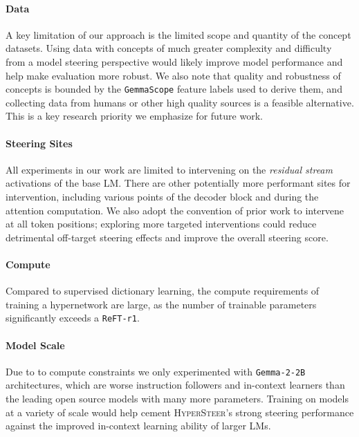 \documentclass[11pt]{article}
\newcommand{\methodname}{\textsc{HyperSteer}}
\newcommand{\gemma}{\texttt{Gemma-2-2B}}
\newcommand{\gpt}{\texttt{gpt-4o-mini}}
\begin{document}
\paragraph{Data} A key limitation of our approach is the limited scope and quantity of the concept datasets. Using data with concepts of much greater complexity and difficulty from a model steering perspective would likely improve model performance and help make evaluation more robust. We also note that quality and robustness of concepts is bounded by the \texttt{GemmaScope} feature labels used to derive them, and collecting data from humans or other high quality sources is a feasible alternative. This is a key research priority we emphasize for future work.


\paragraph{Steering Sites} All experiments in our work are limited to intervening on the \textit{residual stream} activations of the base LM. There are other potentially more performant sites for intervention, including various points of the decoder block and during the attention computation. We also adopt the convention of prior work to intervene at all token positions; exploring more targeted interventions could reduce detrimental off-target steering effects and improve the overall steering score.

\paragraph{Compute} Compared to supervised dictionary learning, the compute requirements of training a hypernetwork are large, as the number of trainable parameters significantly exceeds a \texttt{ReFT-r1}.

\paragraph{Model Scale} Due to to compute constraints we only experimented with \gemma\; architectures, which are worse instruction followers and in-context learners than the leading open source models with many more parameters. Training on models at a variety of scale would help cement \methodname\;'s strong steering performance against the improved in-context learning ability of larger LMs.
\end{document}
